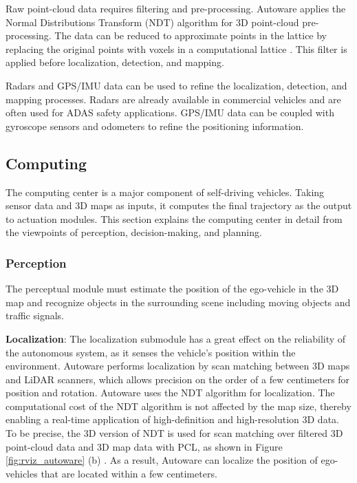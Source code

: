 Raw point-cloud data requires filtering and pre-processing.
Autoware applies the Normal Distributions Transform (NDT)
algorithm \cite{biber2003normal} for 3D point-cloud pre-processing. 
The data can be reduced to approximate
points in the lattice by replacing the original points with voxels in a computational lattice \cite{magnusson2009three}.
This filter is applied before localization, detection, and
mapping.

Radars and GPS/IMU data can be used to refine the
localization, detection, and mapping processes.
Radars are already available in commercial vehicles and are often used
for ADAS safety applications.
GPS/IMU data can be coupled with gyroscope sensors and odometers to refine the
positioning information.

\subsection{Computing}
\label{sec:computing}

The computing center is a major component of self-driving
vehicles.
Taking sensor data and 3D maps as inputs, it computes the final
trajectory as the output to actuation modules.
This section explains the computing center in detail from the viewpoints of perception,
decision-making, and planning.

\subsubsection{Perception}
\label{sec:perception}
The perceptual module must estimate the position of the
ego-vehicle in the 3D map and recognize objects in the surrounding scene
including moving objects and traffic signals.

\textbf{Localization}:
The localization submodule has a great effect on the
reliability of the autonomous system, as it senses the vehicle's position within the environment.
Autoware performs localization by scan matching between 3D maps and
LiDAR scanners, which allows precision on the order of a few centimeters for
position and rotation.
Autoware uses the NDT \cite{biber2003normal} algorithm for
localization.
The computational cost of the NDT algorithm is not affected by the map
size, thereby enabling a real-time application of high-definition and high-resolution 3D data.
To be precise, the 3D version of NDT is used for scan matching
over filtered 3D point-cloud data and 3D map data with PCL, as shown
in Figure \ref{fig:rviz_autoware} (b) \cite{magnusson2009three}.
As a result, Autoware can localize the position of ego-vehicles that are located within a few centimeters.

